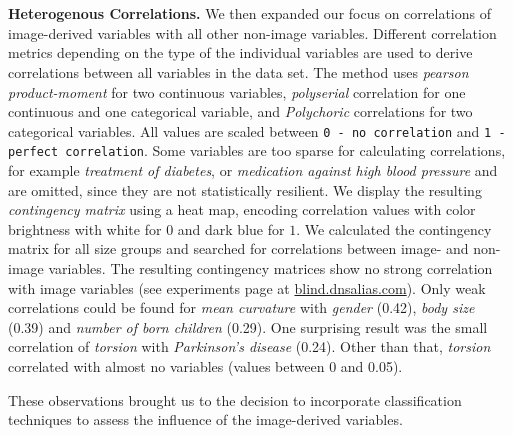 \documentclass[a4paper,twoside]{style/article}
\begin{document}
\\\\
\noindent \textbf{Heterogenous Correlations.}
We then expanded our focus on correlations of image-derived variables with all other non-image variables.
Different correlation metrics depending on the type of the individual variables are used to derive correlations between all variables in the data set.
The method uses \emph{pearson product-moment} for two continuous variables, \emph{polyserial} correlation for one continuous and one categorical variable, and \emph{Polychoric} correlations for two categorical variables.
All values are scaled between \texttt{0 - no correlation} and \texttt{1 - perfect correlation}.
Some variables are too sparse for calculating correlations, for example \emph{treatment of diabetes}, or \emph{medication against high blood pressure} and are omitted, since they are not statistically resilient.
We display the resulting \emph{contingency matrix} using a heat map, encoding correlation values with color brightness with white for $0$ and dark blue for $1$.
We calculated the contingency matrix for all size groups and searched for correlations between image- and non-image variables.
The resulting contingency matrices show no strong correlation with image variables (see experiments page at \url{blind.dnsalias.com}).
Only weak correlations could be found for \emph{mean curvature} with \emph{gender} (0.42), \emph{body size} (0.39) and \emph{number of born children} (0.29).
One surprising result was the small correlation of \emph{torsion} with \emph{Parkinson's disease} (0.24).
Other than that, \emph{torsion} correlated with almost no variables (values between 0 and 0.05).

These observations brought us to the decision to incorporate classification techniques to assess the influence of the image-derived variables.
\end{document}
